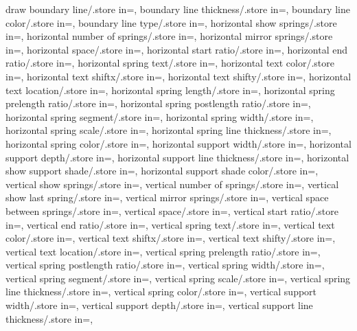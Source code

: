 {draw boundary line/.store in=\drawboundryline,
boundary line thickness/.store in=\blinethick,
boundary line color/.store in=\blinecolor,
boundary line type/.store in=\blinetype,
horizontal show springs/.store in=\showhorizontalsprings,
horizontal number of springs/.store in=\horspringnumber,
horizontal mirror springs/.store in=\hormirrorspring,
horizontal space/.store in=\horspringspace,
horizontal start ratio/.store in=\horspringstartratio,
horizontal end ratio/.store in=\horspringendratio,
horizontal spring text/.store in=\horspringtext,
horizontal text color/.store in=\hortextcolor,
horizontal text shiftx/.store in=\hortextshiftx,
horizontal text shifty/.store in=\hortextshifty,
horizontal text location/.store in=\hortextloc,
horizontal spring length/.store in=\horspringlength,
horizontal spring prelength ratio/.store in=\horprelenratio,
horizontal spring postlength ratio/.store in=\horpostlenratio,
horizontal spring segment/.store in=\horsegm,
horizontal spring width/.store in=\horsprwid,
horizontal spring scale/.store in=\horsprscale,
horizontal spring line thickness/.store in=\horsprlinethk,
horizontal spring color/.store in=\horsprcolor,
horizontal support width/.store in=\horsuppwidth,
horizontal support depth/.store in=\horsuppdepth,
horizontal support line thickness/.store in=\horsupplinethk,
horizontal show support shade/.store in=\horshowsuppshade,
horizontal support shade color/.store in=\horsuppshadecol,
vertical show springs/.store in=\showverticalsprings,
vertical number of springs/.store in=\verspringnumber,
vertical show last spring/.store in=\vershowlastspring,
vertical mirror springs/.store in=\vermirrorspring,
vertical space between springs/.store in=\verspbtwspr,
vertical space/.store in=\verspringspace,
vertical start ratio/.store in=\verspringstartratio,
vertical end ratio/.store in=\verspringendratio,
vertical spring text/.store in=\verspringtext,
vertical text color/.store in=\vertextcolor,
vertical text shiftx/.store in=\vertextshiftx,
vertical text shifty/.store in=\vertextshifty,
vertical text location/.store in=\vertextloc,
vertical spring prelength ratio/.store in=\verprelenratio,
vertical spring postlength ratio/.store in=\verpostlenratio,
vertical spring width/.store in=\versprwid,
vertical spring segment/.store in=\versegm,
vertical spring scale/.store in=\versprscale,
vertical spring line thickness/.store in=\versprlinethk,
vertical spring color/.store in=\versprcolor,
vertical support width/.store in=\versuppwidth,
vertical support depth/.store in=\versuppdepth,
vertical support line thickness/.store in=\versupplinethk,
}
